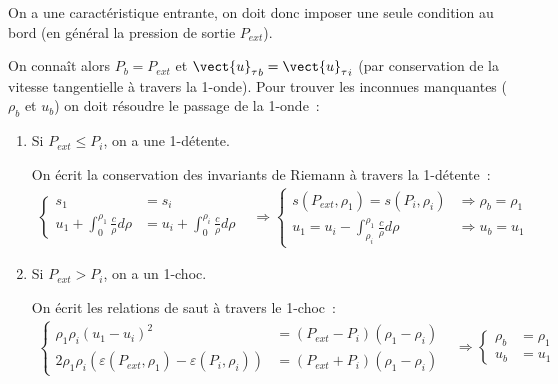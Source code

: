 On a une caractéristique entrante,
on doit donc imposer une seule condition  au bord
(en général la pression de sortie $P_{ext}$).

On connaît alors $P_b = P_{ext}$ et ${\vect{u}_\tau}_b = {\vect{u}_\tau}_i$
(par conservation de la vitesse tangentielle à travers la 1-onde).
Pour trouver les inconnues manquantes ($\rho_b$ et $u_b$)
on doit résoudre le passage de la 1-onde~:

\begin{enumerate}

\item Si $P_{ext} \leqslant P_i$,
on a une 1-détente.

On écrit la conservation
des invariants de Riemann à travers la 1-détente~:
\begin{equation}
\begin{aligned}
\left\{
\begin{aligned}
s_1 &= s_i\\[0.5em]
u_1 + \displaystyle\int_0^{\rho_1} \frac{c}{\rho} d\rho
&= u_i + \displaystyle\int_0^{\rho_i} \frac{c}{\rho} d\rho
\end{aligned}
\right.
&\Rightarrow
\left\{
\begin{aligned}
s(P_{ext},\rho_1) = s(P_i,\rho_i)
&\Rightarrow \rho_b=\rho_1\\[0.5em]
u_1 = u_i - \displaystyle\int_{\rho_i}^{\rho_1} \frac{c}{\rho} d\rho
&\Rightarrow u_b = u_1
\end{aligned}
\right.
\end{aligned}
\end{equation}

\item Si $P_{ext} > P_i$,
on a un 1-choc.

On écrit les relations de saut à travers le 1-choc~:
\begin{equation}
\begin{aligned}
\left\{
\begin{aligned}
\rho_1 \rho_i (u_1 - u_i)^2
&= (P_{ext} - P_i)(\rho_1 - \rho_i)\\[0.5em]
2\rho_1 \rho_i (\varepsilon(P_{ext},\rho_1) - \varepsilon(P_i,\rho_i))
&= (P_{ext} + P_i)(\rho_1 - \rho_i)
\end{aligned}
\right.
&\Rightarrow
\left\{
\begin{aligned}
\rho_b &= \rho_1\\[0.5em]
u_b &= u_1
\end{aligned}
\right.
\end{aligned}
\end{equation}


\end{enumerate}
